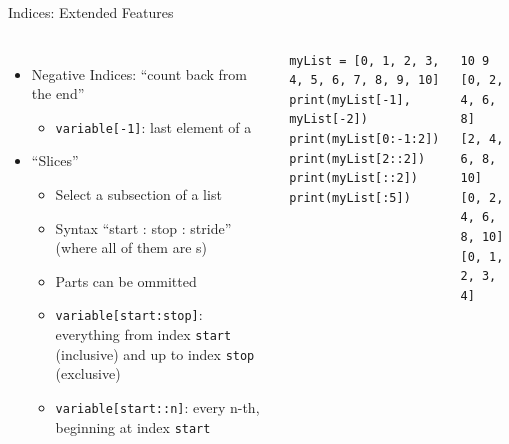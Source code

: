 \begin{frame}[fragile]{Indices: Extended Features}
%
\vspace{-15pt}
\begin{columns}[t]
\begin{itemize}
\item Negative Indices: \enquote{count back from the end}
	\begin{itemize}
	\item \texttt{variable[-1]}: last element of a 
	\end{itemize}
\item \enquote{Slices}
	\begin{itemize}
	\item Select a subsection of a list
	\item Syntax \enquote{start : stop : stride} \\
		(where all of them are s)
	\item Parts can be ommitted
	\item \texttt{variable[start:stop]}: everything from index \texttt{start} (inclusive) and up to index \texttt{stop} (exclusive)
	\item \texttt{variable[start::n]}: every n-th, beginning at index \texttt{start}
	\end{itemize}
\end{itemize}
%
\vspace{-6pt}
\begin{codebox}
\begin{verbatim}
myList = [0, 1, 2, 3, 4, 5, 6, 7, 8, 9, 10]
print(myList[-1], myList[-2])
print(myList[0:-1:2])
print(myList[2::2])
print(myList[::2])
print(myList[:5])
\end{verbatim}
\end{codebox}
%
\begin{cmdbox}[Output]
\begin{verbatim}
10 9
[0, 2, 4, 6, 8]
[2, 4, 6, 8, 10]
[0, 2, 4, 6, 8, 10]
[0, 1, 2, 3, 4]
\end{verbatim}
\end{cmdbox}\end{columns}
%
\end{frame}


